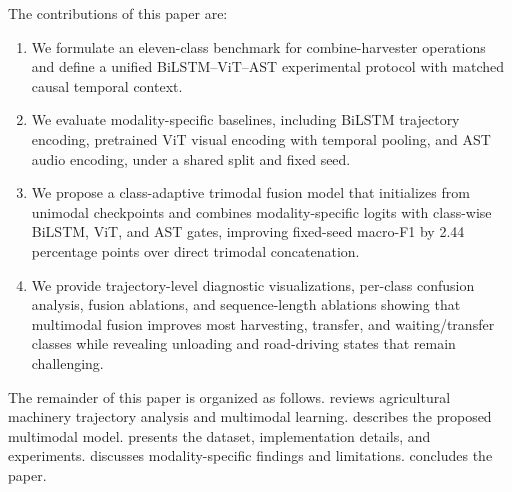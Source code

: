 The contributions of this paper are:
\begin{enumerate}
    \item We formulate an eleven-class \task{} benchmark for combine-harvester operations and define a unified BiLSTM--ViT--AST experimental protocol with matched causal temporal context.
    \item We evaluate modality-specific baselines, including BiLSTM trajectory encoding, pretrained ViT visual encoding with temporal pooling, and AST audio encoding, under a shared split and fixed seed.
    \item We propose a class-adaptive trimodal fusion model that initializes from unimodal checkpoints and combines modality-specific logits with class-wise BiLSTM, ViT, and AST gates, improving fixed-seed macro-F1 by 2.44 percentage points over direct trimodal concatenation.
    \item We provide trajectory-level diagnostic visualizations, per-class confusion analysis, fusion ablations, and sequence-length ablations showing that multimodal fusion improves most harvesting, transfer, and waiting/transfer classes while revealing unloading and road-driving states that remain challenging.
\end{enumerate}

The remainder of this paper is organized as follows.  reviews agricultural machinery trajectory analysis and multimodal learning.  describes the proposed multimodal model.  presents the dataset, implementation details, and experiments.  discusses modality-specific findings and limitations.  concludes the paper.
